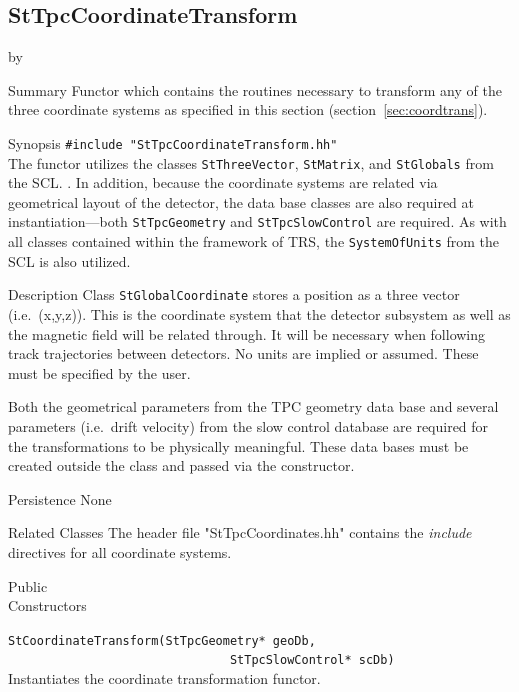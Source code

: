 \documentclass[twoside]{article}
\newcommand{\name}[1]{\textsf{#1}}%
\newcommand{\comp}[1]{\texttt{#1}}%
\newcommand{\entrylabel}[1]{\mbox{\textbf{{#1}}}\hfil}%
\newenvironment{entry}
{\begin{list}{}%
    {\renewcommand{\makelabel}{\entrylabel}%
     \setlength{\labelwidth}{90pt}%
     \setlength{\leftmargin}{\labelwidth}
     \advance\leftmargin by \labelsep%
      }%
    }%
  {\end{list}}
\newcommand{\Entrylabel}[1]%
{\raisebox{0pt}[1ex][0pt]{\makebox[\labelwidth][l]%
    {\parbox[t]{\labelwidth}{\hspace{0pt}\textbf{{#1}}}}}}
\newenvironment{Entry}%
{\renewcommand{\entrylabel}{\Entrylabel}\begin{entry}}%
  {\end{entry}}
\begin{document}
\subsection{StTpcCoordinateTransform} 
\label{sec:stCoordinateTransform}

\begin{Entry}
\item[Summary]
  Functor which contains the routines necessary to transform any
  of the three coordinate systems as specified in this section 
  (section~\ref{sec:coordtrans}).

\item[Synopsis]
  \verb+#include "StTpcCoordinateTransform.hh"+\\
  The functor utilizes the classes \comp{StThreeVector},
  \comp{StMatrix}, and \comp{StGlobals} from the SCL. .
  In addition, because the coordinate systems are related via 
  geometrical layout of the detector, the data base classes
  are also required at instantiation---both \comp{StTpcGeometry}
  and \comp{StTpcSlowControl} are required.  As with all 
  classes contained within the framework of \name{TRS},
  the \comp{SystemOfUnits} from the SCL is also utilized.

\item[Description]
Class \comp{StGlobalCoordinate} stores a position as a three
vector (i.e.~(x,y,z)).
This is the coordinate system that the detector subsystem as well as the
magnetic field will be related through.  It will be necessary when
following track trajectories between detectors.  No units are implied
or assumed.  These must be specified by the user.

Both the geometrical parameters from the TPC geometry data base and 
several parameters (i.e.~drift velocity) from the slow control database 
are required for the transformations to be physically meaningful.
These data bases must be created outside the class and passed
via the constructor.
   
\item[Persistence]
   None

\item[Related Classes]
The header file "StTpcCoordinates.hh" contains the {\em include}
directives for all coordinate systems.

\item[Public \\ Constructors]

   \verb+StCoordinateTransform(StTpcGeometry* geoDb,+\\
   \verb+                               StTpcSlowControl* scDb)+\\
   Instantiates the coordinate transformation functor.  


\end{Entry}
\end{document}
